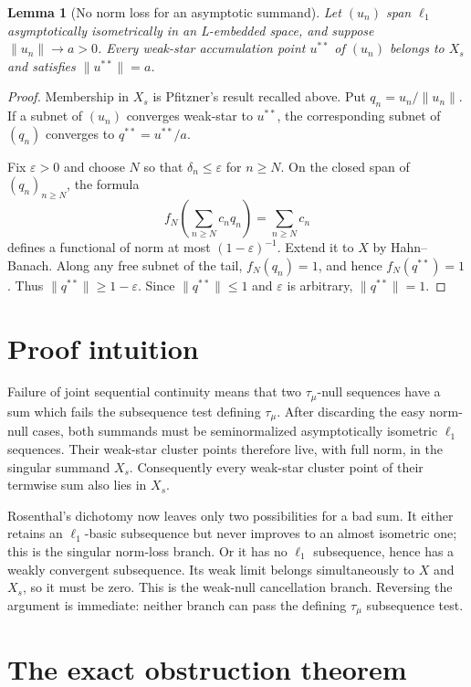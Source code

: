 \documentclass[11pt]{article}
\newtheorem{lemma}[theorem]{Lemma}
\theoremstyle{definition}
\theoremstyle{remark}
\newcommand{\ellone}{\ell_1}
\newcommand{\taumu}{\tau_\mu}
\begin{document}
\begin{lemma}[No norm loss for an asymptotic summand]
\label{lem:no-loss}
Let $(u_n)$ span $\ellone$ asymptotically isometrically in an L-embedded
space, and suppose $\|u_n\|\to a>0$.  Every weak-star accumulation point
$u^{**}$ of $(u_n)$ belongs to $X_s$ and satisfies $\|u^{**}\|=a$.
\end{lemma}

\begin{proof}
Membership in $X_s$ is Pfitzner's result recalled above.  Put
$q_n=u_n/\|u_n\|$.  If a subnet of $(u_n)$ converges weak-star to $u^{**}$,
the corresponding subnet of $(q_n)$ converges to $q^{**}=u^{**}/a$.

Fix $\varepsilon>0$ and choose $N$ so that $\delta_n\leq\varepsilon$ for
$n\geq N$.  On the closed span of $(q_n)_{n\geq N}$, the formula
\[
       f_N\left(\sum_{n\geq N}c_nq_n\right)=\sum_{n\geq N}c_n
\]
defines a functional of norm at most $(1-\varepsilon)^{-1}$.  Extend it to
$X$ by Hahn--Banach.  Along any free subnet of the tail,
$f_N(q_n)=1$, and hence $f_N(q^{**})=1$.  Thus
$\|q^{**}\|\geq1-\varepsilon$.  Since $\|q^{**}\|\leq1$ and
$\varepsilon$ is arbitrary, $\|q^{**}\|=1$.
\end{proof}

\section{Proof intuition}

Failure of joint sequential continuity means that two $\taumu$-null
sequences have a sum which fails the subsequence test defining $\taumu$.
After discarding the easy norm-null cases, both summands must be
seminormalized asymptotically isometric $\ellone$ sequences.  Their weak-star
cluster points therefore live, with full norm, in the singular summand $X_s$.
Consequently every weak-star cluster point of their termwise sum also lies in
$X_s$.

Rosenthal's dichotomy now leaves only two possibilities for a bad sum.  It
either retains an $\ellone$-basic subsequence but never improves to an almost
isometric one; this is the singular norm-loss branch.  Or it has no
$\ellone$ subsequence, hence has a weakly convergent subsequence.  Its weak
limit belongs simultaneously to $X$ and $X_s$, so it must be zero.  This is
the weak-null cancellation branch.  Reversing the argument is immediate:
neither branch can pass the defining $\taumu$ subsequence test.

\section{The exact obstruction theorem}
\end{document}
